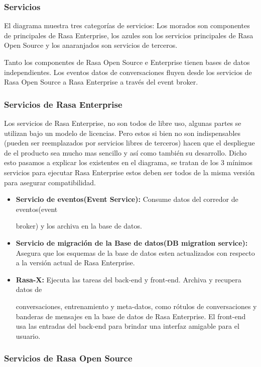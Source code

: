 \subsubsection{Servicios}
El diagrama muestra tres categorías de servicios: Los morados son componentes de principales de
Rasa
Enterprise, los azules son los servicios principales de Rasa Open Source y los anaranjados son
servicios
de terceros.

Tanto los componentes de Rasa Open Source e Enterprise tienen bases de datos independientes. Los
eventos
datos de conversaciones fluyen desde los servicios de Rasa Open Source a Rasa Enterprise a través
del event broker.

\subsubsection{Servicios de Rasa Enterprise}

Los servicios de Rasa Enterprise, no son todos de libre uso, algunas partes se utilizan bajo un
modelo de
licencias. Pero estos si bien no son indispensables (pueden ser reemplazados por servicios libres
de terceros) hacen que el despliegue de el producto sea mucho mas sencillo y así como también su
desarrollo. Dicho esto pasamos a explicar los existentes en el diagrama, se tratan de los 3 mínimos
servicios para
ejecutar Rasa Enterprise estos deben ser todos de la misma versión para asegurar compatibilidad.

\begin{itemize}
	\item \textbf{Servicio de eventos(Event Service):} Consume datos del corredor de eventos(event

	      broker) y los archiva en la base de datos.
	\item \textbf{Servicio de migración de la Base de datos(DB migration service):}  Asegura que
	      los esquemas de la base de datos
	      esten actualizados con respecto a la versión actual de Rasa Enterprise.
	\item \textbf{Rasa-X:} Ejecuta las tareas del back-end y front-end. Archiva y recupera datos de

	      conversaciones, entrenamiento y meta-datos, como rótulos de conversaciones y banderas de
	      mensajes
	      en la base de datos de Rasa Enterprise. El front-end usa las entradas del back-end para brindar
	      una
	      interfaz amigable para el usuario.
\end{itemize}

\subsubsection{Servicios de Rasa Open Source}

